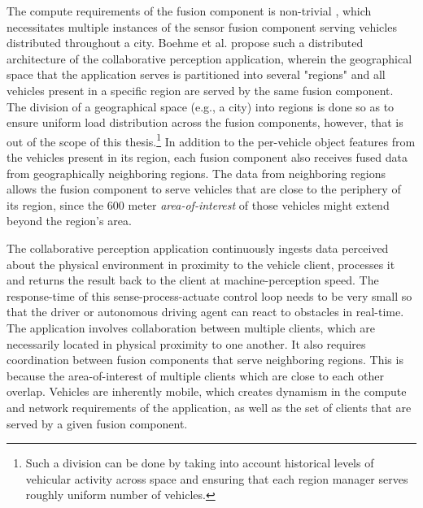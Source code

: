 \par The compute requirements of the fusion component is non-trivial \cite{fusioneye}, which necessitates multiple instances of the sensor fusion component serving vehicles distributed throughout a city. Boehme et al. \cite{talkycars} propose such a distributed architecture of the collaborative perception application, wherein the geographical space that the application serves is partitioned into several "regions" and all vehicles present in a specific region are served by the same fusion component. The division of a geographical space (e.g., a city) into regions is done so as to ensure uniform load distribution across the fusion components, however, that is out of the scope of this thesis.\footnote{Such a division can be done by taking into account historical levels of vehicular activity across space and ensuring that each region manager serves roughly uniform number of vehicles.} In addition to the per-vehicle object features from the vehicles present in its region, each fusion component also receives fused data from geographically neighboring regions. The data from neighboring regions allows the fusion component to serve vehicles that are close to the periphery of its region, since the 600 meter \textit{area-of-interest} of those vehicles might extend beyond the region's area. 

\par The collaborative perception application continuously ingests data perceived about the physical environment in proximity to the vehicle client, processes it and returns the result back to the client at machine-perception speed. The response-time of this sense-process-actuate control loop needs to be very small so that the driver or autonomous driving agent can react to obstacles in real-time. The application involves collaboration between multiple clients, which are necessarily located in physical proximity to one another. It also requires coordination between fusion components that serve neighboring regions. This is because the area-of-interest of multiple clients which are close to each other overlap. Vehicles are inherently mobile, which creates dynamism in the compute and network requirements of the application, as well as the set of clients that are served by a given fusion component. 

